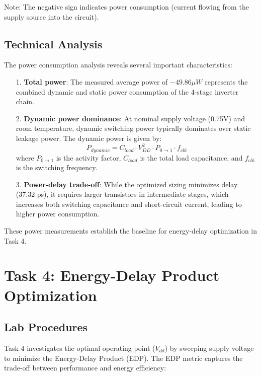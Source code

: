 \documentclass[UTF8,12pt,a4paper]{ctexart}
\begin{document}
Note: The negative sign indicates power consumption (current flowing from the supply source into the circuit).

\subsection{Technical Analysis}

The power consumption analysis reveals several important characteristics:

\begin{itemize}
    \item[1.] \textbf{Total power}: The measured average power of $-49.86 \mu W$ represents the combined dynamic and static power consumption of the 4-stage inverter chain.
    
    \item[2.] \textbf{Dynamic power dominance}: At nominal supply voltage (0.75V) and room temperature, dynamic switching power typically dominates over static leakage power. The dynamic power is given by:
    $$P_{dynamic} = C_{load} \cdot V_{DD}^2 \cdot P_{0 \rightarrow 1} \cdot f_{clk}$$
    where $P_{0 \rightarrow 1}$ is the activity factor, $C_{load}$ is the total load capacitance, and $f_{clk}$ is the switching frequency.
    
    \item[3.] \textbf{Power-delay trade-off}: While the optimized sizing minimizes delay (37.32 ps), it requires larger transistors in intermediate stages, which increases both switching capacitance and short-circuit current, leading to higher power consumption.
\end{itemize}

These power measurements establish the baseline for energy-delay optimization in Task 4.

\newpage
\section{Task 4: Energy-Delay Product Optimization}

\subsection{Lab Procedures}

Task 4 investigates the optimal operating point ($V_{dd}$) by sweeping supply voltage to minimize the Energy-Delay Product (EDP). The EDP metric captures the trade-off between performance and energy efficiency:
\end{document}
